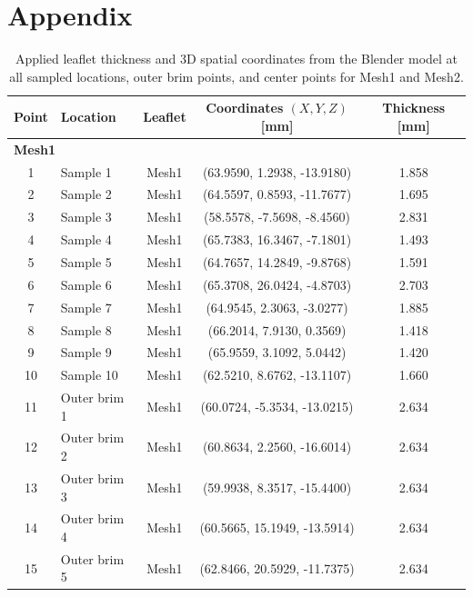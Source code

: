 \chapter*{Appendix}\label{chap:appendix}



\begin{table}[htbp]
  \centering
  \caption{Applied leaflet thickness and 3D spatial coordinates from the Blender model at all sampled locations, outer brim points, and center points for Mesh1 and Mesh2.}
  \label{tab:measurements}
  \scriptsize
  \setlength{\tabcolsep}{10pt}
  \renewcommand{\arraystretch}{1.00}
  \begin{tabular}{c l c c c}
    \toprule
    Point & Location & Leaflet & Coordinates $(X, Y, Z)$ [mm] & Thickness [mm] \\
    \midrule
    \multicolumn{5}{l}{\textbf{Mesh1}} \\
     1 & Sample 1   & Mesh1 & (63.9590, 1.2938, -13.9180) & 1.858 \\
     2 & Sample 2   & Mesh1 & (64.5597, 0.8593, -11.7677) & 1.695 \\
     3 & Sample 3   & Mesh1 & (58.5578, -7.5698, -8.4560)  & 2.831 \\
     4 & Sample 4   & Mesh1 & (65.7383, 16.3467, -7.1801) & 1.493 \\
     5 & Sample 5   & Mesh1 & (64.7657, 14.2849, -9.8768) & 1.591 \\
     6 & Sample 6   & Mesh1 & (65.3708, 26.0424, -4.8703) & 2.703 \\
     7 & Sample 7   & Mesh1 & (64.9545, 2.3063, -3.0277)   & 1.885 \\
     8 & Sample 8   & Mesh1 & (66.2014, 7.9130, 0.3569)    & 1.418 \\
     9 & Sample 9   & Mesh1 & (65.9559, 3.1092, 5.0442)    & 1.420 \\
    10 & Sample 10  & Mesh1 & (62.5210, 8.6762, -13.1107) & 1.660 \\
    11 & Outer brim 1 & Mesh1 & (60.0724, -5.3534, -13.0215) & 2.634 \\
    12 & Outer brim 2 & Mesh1 & (60.8634, 2.2560, -16.6014) & 2.634 \\
    13 & Outer brim 3 & Mesh1 & (59.9938, 8.3517, -15.4400) & 2.634 \\
    14 & Outer brim 4 & Mesh1 & (60.5665, 15.1949, -13.5914) & 2.634 \\
    15 & Outer brim 5 & Mesh1 & (62.8466, 20.5929, -11.7375) & 2.634 \\

\end{tabular}
\end{table}
